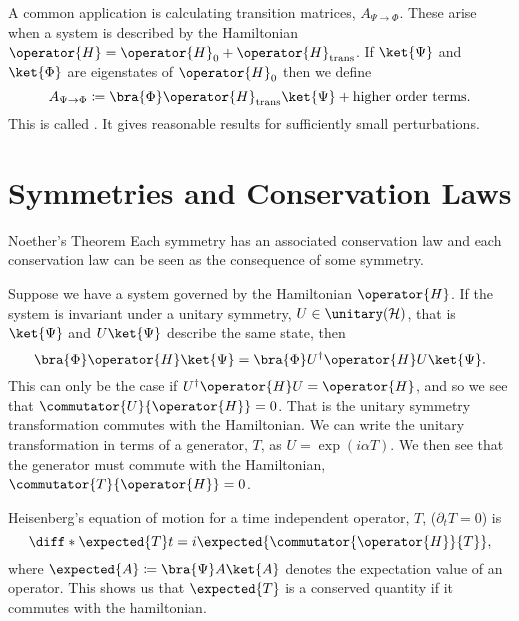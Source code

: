 \documentclass[fleqn]{NotesClass}
\newcommand*{\hermit}{\dagger}
\newcommand*{\hilbert}{\mathcal{H}}
\begin{document}
    A common application is calculating transition matrices, \(A_{\Psi \to \Phi}\).
    These arise when a system is described by the Hamiltonian \(\operator{H} = \operator{H}_0 + \operator{H}_{\mathrm{trans}}\).
    If \(\ket{\Psi}\) and \(\ket{\Phi}\) are eigenstates of \(\operator{H}_0\) then we define
    \begin{equation}
        A_{\Psi\to\Phi} \coloneqq \bra{\Phi} \operator{H}_{\mathrm{trans}} \ket{\Psi} + \text{higher order terms}.
    \end{equation}
    This is called .
    It gives reasonable results for sufficiently small perturbations.
    
    \section{Symmetries and Conservation Laws}
    \begin{thm}{Noether's Theorem}{}
        Each symmetry has an associated conservation law and each conservation law can be seen as the consequence of some symmetry.
    \end{thm}
    
    Suppose we have a system governed by the Hamiltonian \(\operator{H}\).
    If the system is invariant under a unitary symmetry, \(U \in \unitary(\hilbert)\), that is \(\ket{\Psi}\) and \(U\ket{\Psi}\) describe the same state, then
    \begin{equation}
        \bra{\Phi} \operator{H} \ket{\Psi} = \bra{\Phi} U^\hermit \operator{H} U \ket{\Psi}.
    \end{equation}
    This can only be the case if \(U^\hermit \operator{H} U = \operator{H}\), and so we see that \(\commutator{U}{\operator{H}} = 0\).
    That is the unitary symmetry transformation commutes with the Hamiltonian.
    We can write the unitary transformation in terms of a generator, \(T\), as \(U = \exp(i\alpha T)\).
    We then see that the generator must commute with the Hamiltonian, \(\commutator{T}{\operator{H}} = 0\).
    
    Heisenberg's equation of motion for a time independent operator, \(T\), (\(\partial_t T = 0\)) is
    \begin{equation}
        \diff*{\expected{T}}{t} = i\expected{\commutator{\operator{H}}{T}},
    \end{equation}
    where \(\expected{A} \coloneqq \bra{\Psi} A \ket{A}\) denotes the expectation value of an operator.
    This shows us that \(\expected{T}\) is a conserved quantity if it commutes with the hamiltonian.
    
\end{document}

